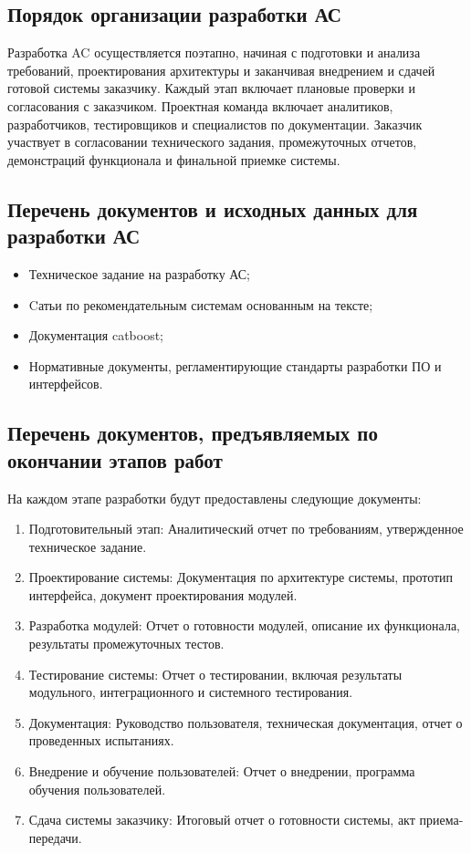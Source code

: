 \subsection{Порядок организации разработки АС}

Разработка AC осуществляется поэтапно,
начиная с подготовки и анализа требований,
проектирования архитектуры и заканчивая внедрением
и сдачей готовой системы заказчику.
Каждый этап включает плановые проверки и согласования с заказчиком.
Проектная команда включает аналитиков, разработчиков,
тестировщиков и специалистов по документации.
Заказчик участвует в согласовании технического задания,
промежуточных отчетов, демонстраций функционала и финальной приемке системы.

\subsection{Перечень документов и исходных данных для разработки АС}

\begin{itemize}
	\item Техническое задание на разработку АС;
	\item Cатьи по рекомендательным системам основанным на тексте;
	\item Документация catboost;
	\item Нормативные документы,
		регламентирующие стандарты разработки ПО и интерфейсов.
\end{itemize}

\subsection{Перечень документов, предъявляемых по окончании этапов работ}

На каждом этапе разработки будут предоставлены следующие документы:

\begin{enumerate}
	\item Подготовительный этап:
		Аналитический отчет по требованиям, утвержденное техническое задание.
	\item Проектирование системы:
		Документация по архитектуре системы,
		прототип интерфейса, документ проектирования модулей.
	\item Разработка модулей:
		Отчет о готовности модулей, описание их функционала,
		результаты промежуточных тестов.
	\item Тестирование системы:
		Отчет о тестировании, включая результаты модульного,
		интеграционного и системного тестирования.
	\item Документация:
		Руководство пользователя, техническая документация,
		отчет о проведенных испытаниях.
	\item Внедрение и обучение пользователей:
		Отчет о внедрении, программа обучения пользователей.
	\item Сдача системы заказчику:
		Итоговый отчет о готовности системы, акт приема-передачи.
\end{enumerate}

